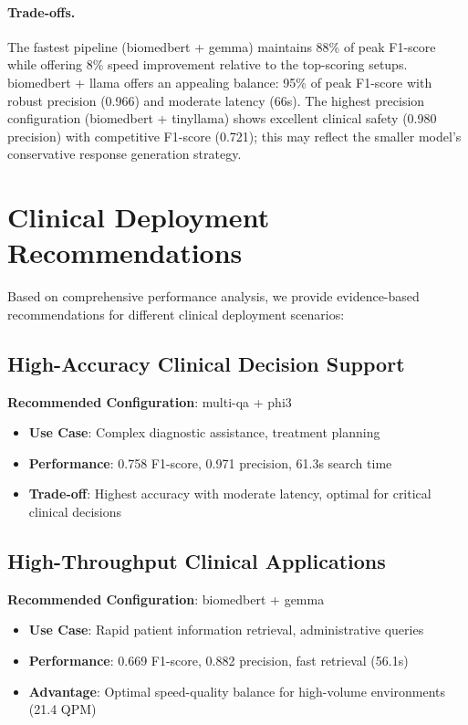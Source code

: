 \paragraph{Trade-offs.} The fastest pipeline (biomedbert + gemma) maintains 88\% of peak F1-score while offering 8\% speed improvement relative to the top-scoring setups. biomedbert + llama offers an appealing balance: 95\% of peak F1-score with robust precision (0.966) and moderate latency (66s). The highest precision configuration (biomedbert + tinyllama) shows excellent clinical safety (0.980 precision) with competitive F1-score (0.721); this may reflect the smaller model's conservative response generation strategy.

\section{Clinical Deployment Recommendations}

Based on comprehensive performance analysis, we provide evidence-based recommendations for different clinical deployment scenarios:

\subsection{High-Accuracy Clinical Decision Support}
\textbf{Recommended Configuration}: multi-qa + phi3
\begin{itemize}
    \item \textbf{Use Case}: Complex diagnostic assistance, treatment planning
    \item \textbf{Performance}: 0.758 F1-score, 0.971 precision, 61.3s search time
    \item \textbf{Trade-off}: Highest accuracy with moderate latency, optimal for critical clinical decisions
\end{itemize}

\subsection{High-Throughput Clinical Applications}
\textbf{Recommended Configuration}: biomedbert + gemma
\begin{itemize}
    \item \textbf{Use Case}: Rapid patient information retrieval, administrative queries
    \item \textbf{Performance}: 0.669 F1-score, 0.882 precision, fast retrieval (56.1s)
    \item \textbf{Advantage}: Optimal speed-quality balance for high-volume environments (21.4 QPM)
\end{itemize}

